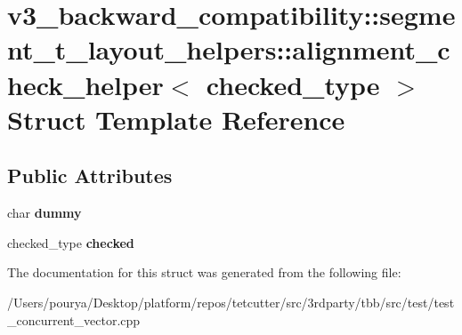 \hypertarget{structv3__backward__compatibility_1_1segment__t__layout__helpers_1_1alignment__check__helper}{}\section{v3\+\_\+backward\+\_\+compatibility\+:\+:segment\+\_\+t\+\_\+layout\+\_\+helpers\+:\+:alignment\+\_\+check\+\_\+helper$<$ checked\+\_\+type $>$ Struct Template Reference}
\label{structv3__backward__compatibility_1_1segment__t__layout__helpers_1_1alignment__check__helper}
\subsection*{Public Attributes}
\begin{DoxyCompactItemize}
\item 
\hypertarget{structv3__backward__compatibility_1_1segment__t__layout__helpers_1_1alignment__check__helper_ad58aa587170c8c5ec3f3d330eb73aa91}{}char {\bfseries dummy}\label{structv3__backward__compatibility_1_1segment__t__layout__helpers_1_1alignment__check__helper_ad58aa587170c8c5ec3f3d330eb73aa91}

\item 
\hypertarget{structv3__backward__compatibility_1_1segment__t__layout__helpers_1_1alignment__check__helper_a5597552c15eb64f700a3820a1f189034}{}checked\+\_\+type {\bfseries checked}\label{structv3__backward__compatibility_1_1segment__t__layout__helpers_1_1alignment__check__helper_a5597552c15eb64f700a3820a1f189034}

\end{DoxyCompactItemize}


The documentation for this struct was generated from the following file\+:\begin{DoxyCompactItemize}
\item 
/\+Users/pourya/\+Desktop/platform/repos/tetcutter/src/3rdparty/tbb/src/test/test\+\_\+concurrent\+\_\+vector.\+cpp\end{DoxyCompactItemize}
